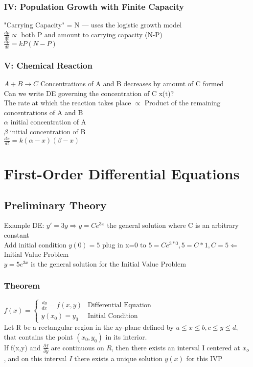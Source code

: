 \documentclass{article}
\begin{document}
\subsubsection*{IV: Population Growth with Finite Capacity}
"Carrying Capacity" = N — uses the logistic growth model\\
$\frac{dp}{dt} \propto $ both P and amount to carrying capacity (N-P)\\
$\frac{dp}{dt}=kP(N-P)$
\subsubsection*{V: Chemical Reaction}
$A+B\rightarrow C$ Concentrations of A and B decreases by amount of C formed \\ 
Can we write DE governing the concentration of C x(t)? \\ 
The rate at which the reaction takes place $\propto$ Product of the remaining concentrations of A and B
\\ $\alpha$ initial concentration of A
\\ $\beta$ initial concentration of B
\\ $\frac{dx}{dt} = k(\alpha - x)(\beta - x)$
\section{First-Order Differential Equations}
\subsection{Preliminary Theory}
Example DE: $y'=3y \Rightarrow \boxed{y=Ce^{3x}}$ the general solution where C is an arbitrary constant
\\[0.05in]Add initial condition $y(0) = 5$ plug in x=0 to $5=Ce^{3*0}, 5=C*1, C=5 \Leftarrow$ Initial Value Problem
\\$y=5e^{3x}$ is the general solution for the Initial Value Problem\\\subsubsection{\textbf{Theorem}}
$f(x) = \begin{cases}
    \frac{dy}{dx} = f(x,y) & \text{Differential Equation}\\
    y(x_0) = y_0  & \text{Initial Condition}
    \end{cases}$\\ Let R be a rectangular region in the xy-plane defined by $a\leq x \leq b, c \leq y \leq d $, that contains the point $(x_0, y_0)$ in its interior. \\[0.1in] If f(x,y) and $\frac{\partial f}{\partial y}$ are continuous on $R$, then there exists an interval I centered at $x_o$, and on this interval $I$ there exists a unique solution $y(x)$ for this IVP\\
\end{document}
